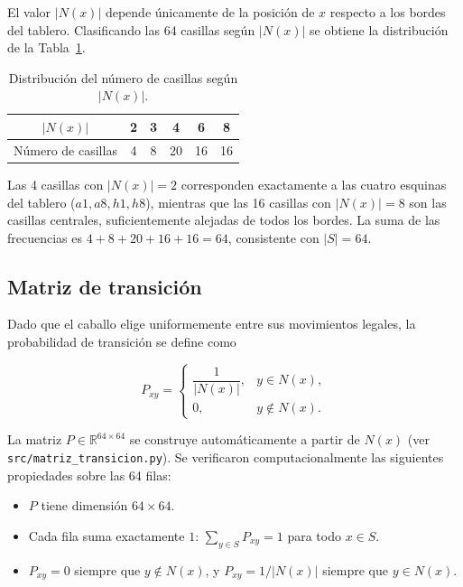 \documentclass[12pt,a4paper]{article}
\begin{document}
El valor \(|N(x)|\) depende únicamente de la posición de \(x\) respecto
a los bordes del tablero. Clasificando las 64 casillas según
\(|N(x)|\) se obtiene la distribución de la Tabla~\ref{tab:distribucion-N}.

\begin{table}[H]
\centering
\caption{Distribución del número de casillas según \(|N(x)|\).}
\label{tab:distribucion-N}

\begin{tabular}{cccccc}
\toprule
\(|N(x)|\) & 2 & 3 & 4 & 6 & 8 \\
\midrule
Número de casillas & 4 & 8 & 20 & 16 & 16 \\
\bottomrule
\end{tabular}

\end{table}

Las 4 casillas con \(|N(x)|=2\) corresponden exactamente a las cuatro
esquinas del tablero (\(a1,a8,h1,h8\)), mientras que las 16 casillas
con \(|N(x)|=8\) son las casillas centrales, suficientemente alejadas
de todos los bordes. La suma de las frecuencias es
\(4+8+20+16+16=64\), consistente con \(|S|=64\).

\subsection{Matriz de transición}

Dado que el caballo elige uniformemente entre sus movimientos legales,
la probabilidad de transición se define como

\[
P_{xy}=
\begin{cases}
\dfrac{1}{|N(x)|}, & y\in N(x),\\[4pt]
0, & y\notin N(x).
\end{cases}
\]

La matriz \(P\in\mathbb{R}^{64\times64}\) se construye
automáticamente a partir de \(N(x)\) (ver
\texttt{src/matriz\_transicion.py}). Se verificaron computacionalmente
las siguientes propiedades sobre las 64 filas:

\begin{itemize}
    \item \(P\) tiene dimensión \(64\times64\).
    \item Cada fila suma exactamente \(1\): \(\sum_{y\in S}P_{xy}=1\)
    para todo \(x\in S\).
    \item \(P_{xy}=0\) siempre que \(y\notin N(x)\), y
    \(P_{xy}=1/|N(x)|\) siempre que \(y\in N(x)\).
\end{itemize}
\end{document}
